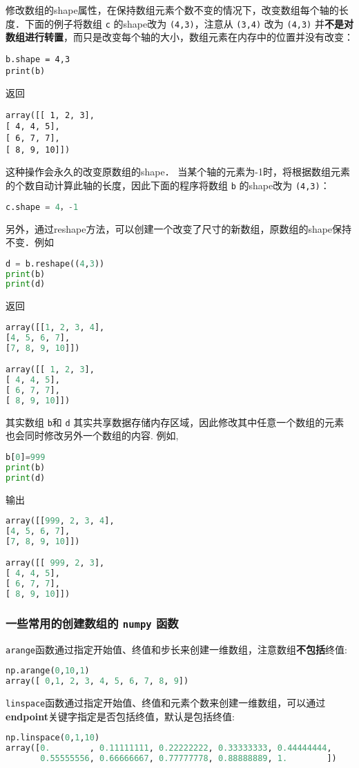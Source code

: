 修改数组的shape属性，在保持数组元素个数不变的情况下，改变数组每个轴的长度．下面的例子将数组 \verb|c| 的shape改为 \verb|(4,3)|，注意从 \verb|(3,4)| 改为 \verb|(4,3)| 并\textbf{不是对数组进行转置}，而只是改变每个轴的大小，数组元素在内存中的位置并没有改变：
\begin{lstlisting}
b.shape = 4,3
print(b)
\end{lstlisting}
返回
\begin{lstlisting}
array([[ 1, 2, 3],
[ 4, 4, 5],
[ 6, 7, 7],
[ 8, 9, 10]])
\end{lstlisting}
这种操作会永久的改变原数组的shape． 当某个轴的元素为-1时，将根据数组元素的个数自动计算此轴的长度，因此下面的程序将数组 \verb|b| 的shape改为 \verb|(4,3)|：
\begin{lstlisting}[language=python]
c.shape = 4，-1
\end{lstlisting}
另外，通过reshape方法，可以创建一个改变了尺寸的新数组，原数组的shape保持不变．例如
\begin{lstlisting}[language=python]
d = b.reshape((4,3))
print(b)
print(d)
\end{lstlisting}
返回
\begin{lstlisting}[language=python]
array([[1, 2, 3, 4],
[4, 5, 6, 7],
[7, 8, 9, 10]])

array([[ 1, 2, 3],
[ 4, 4, 5],
[ 6, 7, 7],
[ 8, 9, 10]])
\end{lstlisting}
其实数组 \verb|b|和 \verb|d| 其实共享数据存储内存区域，因此修改其中任意一个数组的元素也会同时修改另外一个数组的内容. 例如,
\begin{lstlisting}[language=python]
b[0]=999
print(b)
print(d)
\end{lstlisting}
输出
\begin{lstlisting}[language=python]
array([[999, 2, 3, 4],
[4, 5, 6, 7],
[7, 8, 9, 10]])

array([[ 999, 2, 3],
[ 4, 4, 5],
[ 6, 7, 7],
[ 8, 9, 10]])
\end{lstlisting}


\subsubsection{一些常用的创建数组的 \verb|numpy| 函数}
\verb|arange|函数通过指定开始值、终值和步长来创建一维数组，注意数组\textbf{不包括}终值:
\begin{lstlisting}[language=python]
np.arange(0,10,1)
array([ 0,1, 2, 3, 4, 5, 6, 7, 8, 9])
\end{lstlisting}

\verb|linspace|函数通过指定开始值、终值和元素个数来创建一维数组，可以通过\textbf{endpoint}关键字指定是否包括终值，默认是包括终值:
 \begin{lstlisting}[language=python]
np.linspace(0,1,10)
array([0.        , 0.11111111, 0.22222222, 0.33333333, 0.44444444,
       0.55555556, 0.66666667, 0.77777778, 0.88888889, 1.        ])
 \end{lstlisting}

